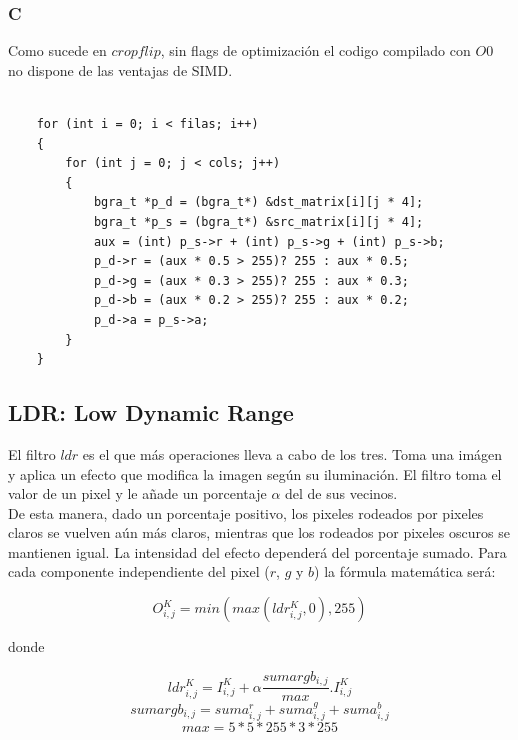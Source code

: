 \subsubsection{C}

Como sucede en $cropflip$, sin flags de optimización el codigo compilado con $O0$ no dispone de las ventajas de SIMD.

\begin{codesnippet}
\begin{verbatim}

    for (int i = 0; i < filas; i++)
    {
        for (int j = 0; j < cols; j++)
        {
            bgra_t *p_d = (bgra_t*) &dst_matrix[i][j * 4];
            bgra_t *p_s = (bgra_t*) &src_matrix[i][j * 4];
            aux = (int) p_s->r + (int) p_s->g + (int) p_s->b;
            p_d->r = (aux * 0.5 > 255)? 255 : aux * 0.5;
            p_d->g = (aux * 0.3 > 255)? 255 : aux * 0.3;
            p_d->b = (aux * 0.2 > 255)? 255 : aux * 0.2;
            p_d->a = p_s->a;
        }
    }

\end{verbatim}
\end{codesnippet}


\subsection{LDR: Low Dynamic Range}

El filtro $ldr$ es el que más operaciones lleva a cabo de los tres.
Toma una imágen y aplica un efecto que modifica la imagen según su iluminación. El filtro toma el valor de un pixel y le añade un porcentaje $\alpha$ del de sus vecinos.\\

De esta manera, dado un porcentaje positivo, los pixeles rodeados por pixeles claros se vuelven
aún más claros, mientras que los rodeados por pixeles oscuros se mantienen igual. La intensidad
del efecto dependerá del porcentaje sumado.
Para cada componente independiente del pixel ($r$, $g$ y $b$) la fórmula matemática será:

\begin{center}
$$O_{i,j}^{K} = min(max(ldr_{i,j}^{K},0),255)$$
\end{center}

donde

\begin{center}
$$ldr_{i,j}^{K} = I_{i,j}^{K} + \alpha \frac{sumargb_{i,j}}{max} . I_{i,j}^{K}$$
$$sumargb_{i,j} = suma_{i,j}^{r} + suma_{i,j}^{g} + suma_{i,j}^{b}$$
$$max = 5*5*255*3*255$$
\end{center}

